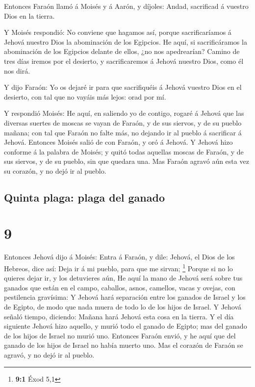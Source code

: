  Entonces Faraón llamó á Moisés y á Aarón, y díjoles:
Andad, sacrificad á vuestro Dios en la tierra.

 Y Moisés respondió: No conviene que hagamos así, porque
sacrificaríamos á Jehová nuestro Dios la abominación de los Egipcios. He
aquí, si sacrificáramos la abominación de los Egipcios delante de ellos,
¿no nos apedrearían?  Camino de tres días iremos por el
desierto, y sacrificaremos á Jehová nuestro Dios, como él nos dirá.

 Y dijo Faraón: Yo os dejaré ir para que sacrifiquéis á
Jehová vuestro Dios en el desierto, con tal que no vayáis más lejos:
orad por mí.

 Y respondió Moisés: He aquí, en saliendo yo de contigo,
rogaré á Jehová que las diversas suertes de moscas se vayan de Faraón, y
de sus siervos, y de su pueblo mañana; con tal que Faraón no falte más,
no dejando ir al pueblo á sacrificar á Jehová.  Entonces
Moisés salió de con Faraón, y oró á Jehová.  Y Jehová hizo
conforme á la palabra de Moisés; y quitó todas aquellas moscas de
Faraón, y de sus siervos, y de su pueblo, sin que quedara una.
 Mas Faraón agravó aún esta vez su corazón, y no dejó ir al
pueblo.

\hypertarget{quinta-plaga-plaga-del-ganado}{%
\subsection{Quinta plaga: plaga del
ganado}\label{quinta-plaga-plaga-del-ganado}}

\hypertarget{section-8}{%
\section{9}\label{section-8}}

 Entonces Jehová dijo á Moisés: Entra á Faraón, y dile:
Jehová, el Dios de los Hebreos, dice así: Deja ir á mi pueblo, para que
me sirvan; \footnote{\textbf{9:1} Éxod 5,1}  Porque si no lo
quieres dejar ir, y los detuvieres aún,  He aquí la mano de
Jehová será sobre tus ganados que están en el campo, caballos, asnos,
camellos, vacas y ovejas, con pestilencia gravísima:  Y
Jehová hará separación entre los ganados de Israel y los de Egipto, de
modo que nada muera de todo lo de los hijos de Israel.  Y
Jehová señaló tiempo, diciendo: Mañana hará Jehová esta cosa en la
tierra.  Y el día siguiente Jehová hizo aquello, y murió
todo el ganado de Egipto; mas del ganado de los hijos de Israel no murió
uno.  Entonces Faraón envió, y he aquí que del ganado de los
hijos de Israel no había muerto uno. Mas el corazón de Faraón se agravó,
y no dejó ir al pueblo.

